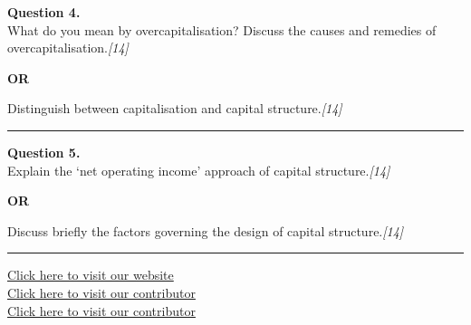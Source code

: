 \documentclass[11pt,a4paper]{article}
\newcommand{\pts}[1]{\hfill   \textit{[#1]}}
\begin{document}
\noindent   \textbf{Question 4.} \\
What do you mean by overcapitalisation? Discuss the causes and remedies of overcapitalisation.\pts{14}

\centerline{   \textbf{OR}}

Distinguish between capitalisation and capital structure.\pts{14}

\medskip\rule{\linewidth}{0.2pt}




\noindent   \textbf{Question 5.} \\
Explain the `net operating income' approach of capital structure.\pts{14}

\centerline{   \textbf{OR}}

Discuss briefly the factors governing the design of capital structure.\pts{14}

\vfill
\rule{\linewidth}{0.4pt}

\begin{center}\small
  \href{https://bhu-exam.vercel.app/}{Click here to visit our website}\\[4pt]
  \href{https://me-aryan.vercel.app/}{Click here to visit our contributor}\\[4pt]
  \href{https://quashan-me.vercel.app/}{Click here to visit our contributor}
\end{center}
\end{document}

